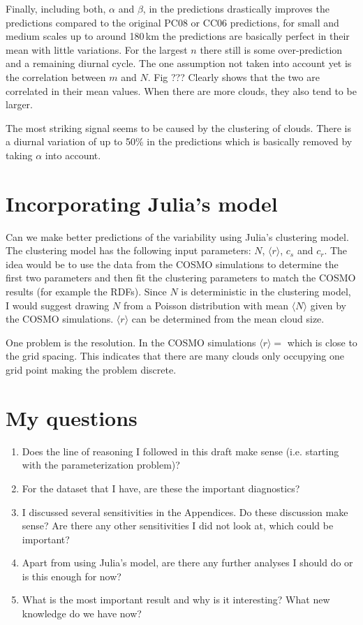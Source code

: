 \documentclass[a4paper, 12pt]{article}
\begin{document}
Finally, including both, $\alpha$ and $\beta$, in the predictions drastically improves the predictions compared to the original PC08 or CC06 predictions, for small and medium scales up to around 180\,km the predictions are basically perfect in their mean with little variations. For the largest $n$ there still is some over-prediction and a remaining diurnal cycle. The one assumption not taken into account yet is the correlation between $m$ and $N$. Fig ??? Clearly shows that the two are correlated in their mean values. When there are more clouds, they also tend to be larger. 

The most striking signal seems to be caused by the clustering of clouds. There is a diurnal variation of up to 50\% in the predictions which is basically removed by taking $\alpha$ into account. 

\section{Incorporating Julia's model}
Can we make better predictions of the variability using Julia's clustering model. The clustering model has the following input parameters: $N$, $\langle r \rangle$, $c_s$ and $c_r$. The idea would be to use the data from the COSMO simulations to determine the first two parameters and then fit the clustering parameters to match the COSMO results (for example the RDFs). Since $N$ is deterministic in the clustering model, I would suggest drawing $N$ from a Poisson distribution with mean $\langle N \rangle$ given by the COSMO simulations. $\langle r \rangle$ can be determined from the mean cloud size.

One problem is the resolution. In the COSMO simulations $\langle r \rangle = $ which is close to the grid spacing. This indicates that there are many clouds only occupying one grid point making the problem discrete.  

\section{My questions}
\begin{enumerate}
 \item Does the line of reasoning I followed in this draft make sense (i.e. starting with the parameterization problem)? 
 \item For the dataset that I have, are these the important diagnostics? 
 \item I discussed several sensitivities in the Appendices. Do these discussion make sense? Are there any other sensitivities I did not look at, which could be important?
 \item Apart from using Julia's model, are there any further analyses I should do or is this enough for now?
 \item What is the most important result and why is it interesting? What new knowledge do we have now?
\end{enumerate}
\end{document}

